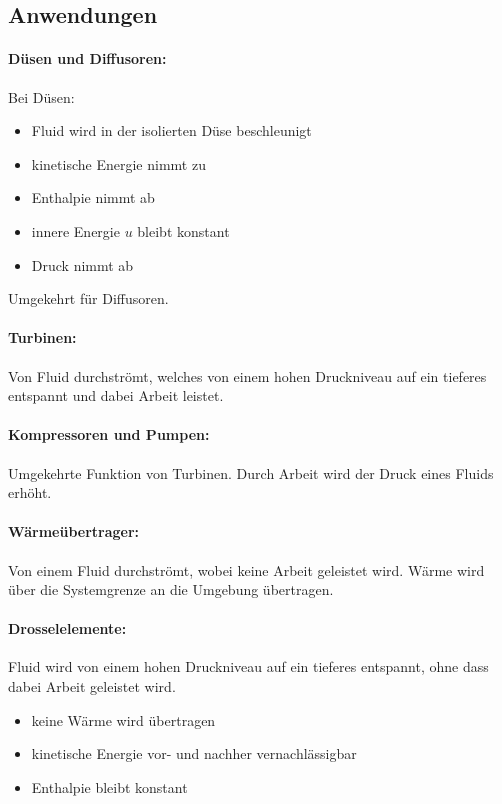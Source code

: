 	
	\subsection{Anwendungen} %
		\paragraph{Düsen und Diffusoren:} %
			
			Bei Düsen:
			\begin{itemize}
				\item Fluid wird in der isolierten Düse beschleunigt
				\item kinetische Energie nimmt zu
				\item Enthalpie nimmt ab
				\item innere Energie $u$ bleibt konstant
				\item Druck nimmt ab
			\end{itemize}
			
			Umgekehrt für Diffusoren.
		
		\paragraph{Turbinen:} %
			Von Fluid durchströmt, welches von einem hohen Druckniveau auf ein tieferes entspannt und dabei Arbeit leistet.
		
		\paragraph{Kompressoren und Pumpen:} %
			Umgekehrte Funktion von Turbinen. Durch Arbeit wird der Druck eines Fluids erhöht.
		
		\paragraph{Wärmeübertrager:} %
			Von einem Fluid durchströmt, wobei keine Arbeit geleistet wird. Wärme wird über die Systemgrenze an die Umgebung übertragen.
		
		\paragraph{Drosselelemente:} %
			Fluid wird von einem hohen Druckniveau auf ein tieferes entspannt, ohne dass dabei Arbeit geleistet wird.
			\begin{itemize}
				\item keine Wärme wird übertragen
				\item kinetische Energie vor- und nachher vernachlässigbar
				\item Enthalpie bleibt konstant
			\end{itemize}
	
